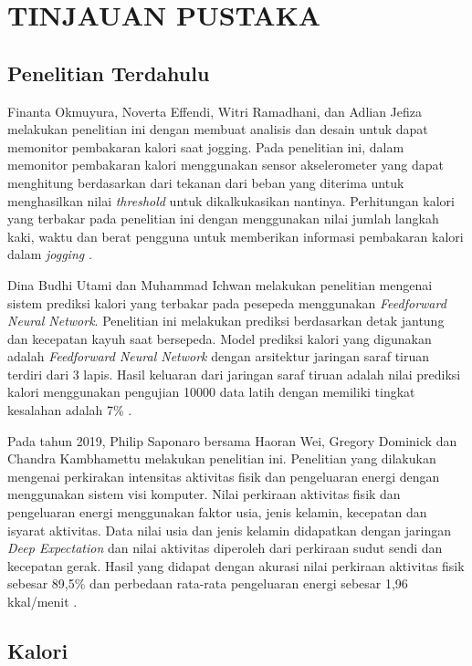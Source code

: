 \chapter{TINJAUAN PUSTAKA}
\label{chap:tinjauanpustaka}

\section{Penelitian Terdahulu}
\label{sec:penelitianterdahulu}

Finanta Okmuyura, Noverta Effendi, Witri Ramadhani, dan Adlian Jefiza melakukan penelitian ini dengan membuat analisis dan desain untuk dapat memonitor pembakaran kalori saat jogging. Pada penelitian ini, dalam memonitor pembakaran kalori menggunakan sensor akselerometer yang dapat menghitung berdasarkan dari tekanan dari beban yang diterima untuk menghasilkan nilai \emph{threshold} untuk dikalkukasikan nantinya. Perhitungan kalori yang terbakar pada penelitian ini dengan menggunakan nilai jumlah langkah kaki, waktu dan berat pengguna untuk memberikan informasi pembakaran kalori dalam \emph{jogging} \parencite{Okmuyura}.

Dina Budhi Utami dan Muhammad Ichwan melakukan penelitian mengenai sistem prediksi kalori yang terbakar pada pesepeda menggunakan \emph{Feedforward Neural Network}. Penelitian ini melakukan prediksi berdasarkan detak jantung dan kecepatan kayuh saat bersepeda. Model prediksi kalori yang digunakan adalah \emph{Feedforward Neural Network} dengan arsitektur jaringan saraf tiruan terdiri dari 3 lapis. Hasil keluaran dari jaringan saraf tiruan adalah nilai prediksi kalori menggunakan pengujian 10000 data latih dengan memiliki tingkat kesalahan adalah 7\% \parencite{Utami}.

Pada tahun 2019, Philip Saponaro bersama Haoran Wei, Gregory Dominick dan Chandra Kambhamettu melakukan penelitian ini. Penelitian yang dilakukan mengenai perkirakan intensitas aktivitas fisik dan pengeluaran energi dengan menggunakan sistem visi komputer. Nilai perkiraan aktivitas fisik dan pengeluaran energi menggunakan faktor usia, jenis kelamin, kecepatan dan isyarat aktivitas. Data nilai usia dan jenis kelamin didapatkan dengan jaringan \emph{Deep Expectation} dan nilai aktivitas diperoleh dari perkiraan sudut sendi dan kecepatan gerak. Hasil yang didapat dengan akurasi nilai perkiraan aktivitas fisik sebesar 89,5\% dan perbedaan rata-rata pengeluaran energi sebesar 1,96 kkal/menit \parencite{Saponaro}.


\section{Kalori}
\label{sec:kalori}


